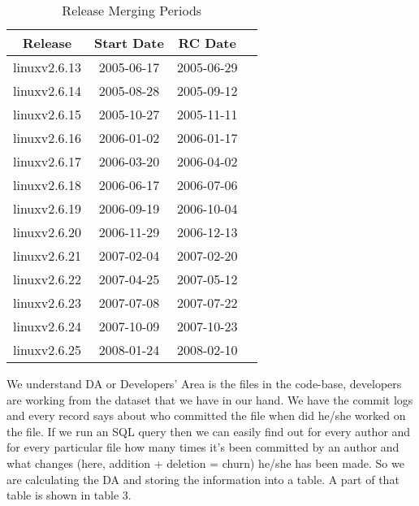 \documentclass{acm_proc_article-sp}
\begin{document}
\begin{table}[ht]
\caption{Release Merging Periods}  %
\centering 						%
\begin{tabular}{c c c c}				%
\hline\hline						%
Release 			& Start Date		& RC Date \\ [0.5ex]
\hline 							%
linuxv2.6.13		& 2005-06-17	& 2005-06-29 \\
linuxv2.6.14		& 2005-08-28	& 2005-09-12 \\
linuxv2.6.15		& 2005-10-27	& 2005-11-11 \\
linuxv2.6.16		& 2006-01-02	& 2006-01-17 \\
linuxv2.6.17		& 2006-03-20	& 2006-04-02 \\
linuxv2.6.18		& 2006-06-17	& 2006-07-06 \\
linuxv2.6.19		& 2006-09-19	& 2006-10-04 \\
linuxv2.6.20  		& 2006-11-29	& 2006-12-13 \\
linuxv2.6.21		& 2007-02-04	& 2007-02-20 \\
linuxv2.6.22		& 2007-04-25	& 2007-05-12 \\
linuxv2.6.23		& 2007-07-08	& 2007-07-22 \\
linuxv2.6.24		& 2007-10-09	& 2007-10-23 \\
linuxv2.6.25		& 2008-01-24	& 2008-02-10 \\
[1ex]							%
\hline 							%
\end{tabular}
\label{table:nonlin} 				%
\end{table}

We understand DA or Developers' Area is the files in the code-base, developers are working from the dataset that we have in our hand. We have the commit logs and every record says about who committed the file when did he/she worked on the file. If we run an SQL query then we can easily find out for every author and for every particular file how many times it's been committed by an author and what changes (here, addition + deletion = churn) he/she has been made. So we are calculating the DA and storing the information into a table. A part of that table is shown in table 3.
\end{document}
